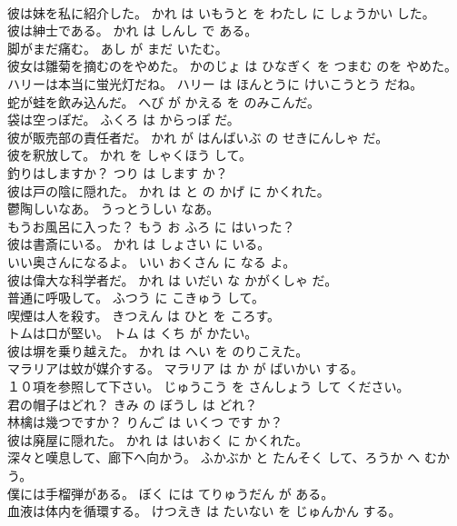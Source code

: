 \documentclass[8pt]{extreport}
\begin{document}
\begin{CJK}{UTF8}{min}
\\	彼は妹を私に紹介した。	かれ は いもうと を わたし に しょうかい した。	
\\	彼は紳士である。	かれ は しんし で ある。	
\\	脚がまだ痛む。	あし が まだ いたむ。	
\\	彼女は雛菊を摘むのをやめた。	かのじょ は ひなぎく を つまむ のを やめた。	
\\	ハリーは本当に蛍光灯だね。	ハリー は ほんとうに けいこうとう だね。	
\\	蛇が蛙を飲み込んだ。	へび が かえる を のみこんだ。	
\\	袋は空っぽだ。	ふくろ は からっぽ だ。	
\\	彼が販売部の責任者だ。	かれ が はんばいぶ の せきにんしゃ だ。	
\\	彼を釈放して。	かれ を しゃくほう して。	
\\	釣りはしますか？	つり は します か？	
\\	彼は戸の陰に隠れた。	かれ は と の かげ に かくれた。	
\\	鬱陶しいなあ。	うっとうしい なあ。	
\\	もうお風呂に入った？	もう お ふろ に はいった？	
\\	彼は書斎にいる。	かれ は しょさい に いる。	
\\	いい奥さんになるよ。	いい おくさん に なる よ。	
\\	彼は偉大な科学者だ。	かれ は いだい な かがくしゃ だ。	
\\	普通に呼吸して。	ふつう に こきゅう して。	
\\	喫煙は人を殺す。	きつえん は ひと を ころす。	
\\	トムは口が堅い。	トム は くち が かたい。	
\\	彼は塀を乗り越えた。	かれ は へい を のりこえた。	
\\	マラリアは蚊が媒介する。	マラリア は か が ばいかい する。	
\\	１０項を参照して下さい。	じゅうこう を さんしょう して ください。	
\\	君の帽子はどれ？	きみ の ぼうし は どれ？	
\\	林檎は幾つですか？	りんご は いくつ です か？	
\\	彼は廃屋に隠れた。	かれ は はいおく に かくれた。	
\\	深々と嘆息して、廊下へ向かう。	ふかぶか と たんそく して、ろうか へ むかう。	
\\	僕には手榴弾がある。	ぼく には てりゅうだん が ある。	
\\	血液は体内を循環する。	けつえき は たいない を じゅんかん する。	

\end{CJK}
\end{document}
